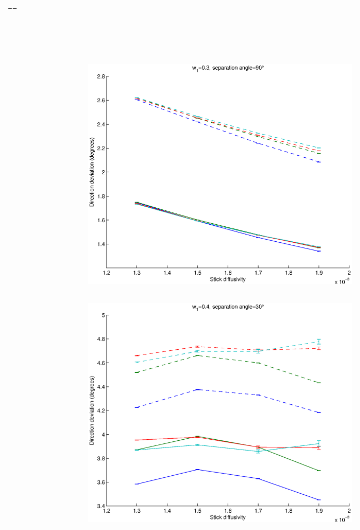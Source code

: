 \documentclass{article}
\begin{document}
\begin{figure}[H]
\begin{adjustwidth}{-\oddsidemargin}{-\rightmargin}
\begin{subfigure}{0.8\paperwidth}
      ~
      \begin{subfigure}{0.3\textwidth}
        \centering
        \includegraphics[width=\textwidth]{figures/synth_bas_weights_diffus__snr=20__w1=3__angle=90.eps}
      \end{subfigure}
  \end{subfigure}
  \begin{subfigure}{0.8\paperwidth}
      \begin{subfigure}{0.3\textwidth}
        \centering
        \includegraphics[width=\textwidth]{figures/synth_bas_weights_diffus__snr=20__w1=4__angle=30.eps}

\end{subfigure}
\end{subfigure}
\end{adjustwidth}
\end{figure}
\end{document}
